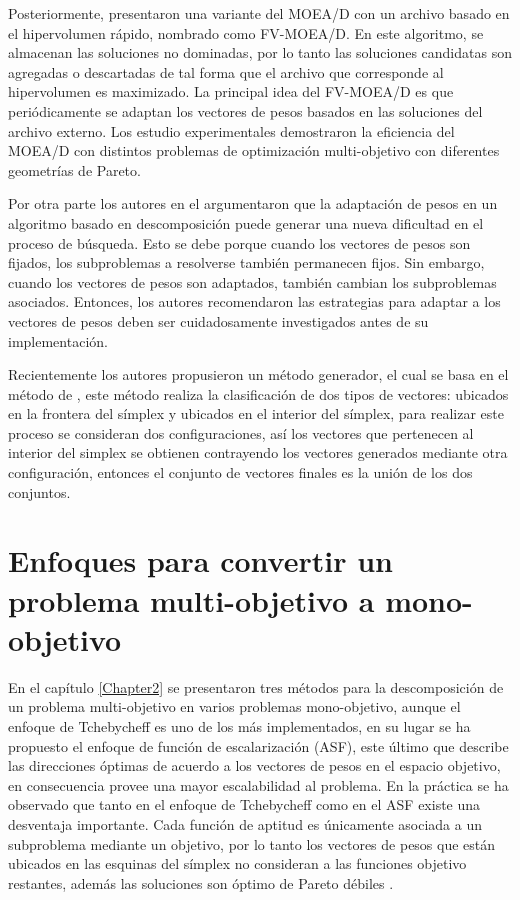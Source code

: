 Posteriormente, \cite{jiang2016towards} presentaron una variante del MOEA/D con un archivo basado en el hipervolumen rápido, nombrado como FV-MOEA/D. 
%
En este algoritmo, se almacenan las soluciones no dominadas, por lo tanto las soluciones candidatas son agregadas o descartadas de tal forma que el archivo que corresponde al hipervolumen es maximizado.
%
La principal idea del FV-MOEA/D es que periódicamente se adaptan los vectores de pesos basados en las soluciones del archivo externo.
%
Los estudio experimentales demostraron la eficiencia del MOEA/D con distintos problemas de optimización multi-objetivo con diferentes geometrías de Pareto.

Por otra parte los autores \citeauthor{giagkiozis2013towards} en el \citeyear{giagkiozis2013towards} argumentaron que la adaptación de pesos en un algoritmo basado en descomposición puede generar una nueva dificultad en el proceso de búsqueda.
%
Esto se debe porque cuando los vectores de pesos son fijados, los subproblemas a resolverse también permanecen fijos.
%
Sin embargo, cuando los vectores de pesos son adaptados, también cambian los subproblemas asociados.
%
Entonces, los autores recomendaron las estrategias para adaptar a los vectores de pesos deben ser cuidadosamente investigados antes de su implementación.
%

Recientemente los autores \cite{li2015evolutionary} propusieron un método generador, el cual se basa en el método de \citeauthor{das1998normal}, este  método realiza la clasificación de dos tipos de vectores: ubicados en la frontera del símplex y ubicados en el interior del símplex, para realizar este proceso se consideran dos configuraciones, así los vectores que pertenecen al interior del simplex se obtienen contrayendo los vectores generados mediante otra configuración, entonces el conjunto de vectores finales es la unión de los dos conjuntos.


\section{Enfoques para convertir un problema multi-objetivo a mono-objetivo}

En el capítulo \ref{Chapter2} se presentaron tres métodos para la descomposición de un problema multi-objetivo en varios problemas mono-objetivo, aunque el enfoque de Tchebycheff es uno de los más implementados, en su lugar se ha propuesto el enfoque de función de escalarización (ASF), este último que describe las direcciones óptimas de acuerdo a los vectores de pesos en el espacio objetivo, en consecuencia provee una mayor escalabilidad al problema.
%
En la práctica se ha observado que tanto en el enfoque de Tchebycheff como en el ASF existe una desventaja importante.
%
Cada función de aptitud es únicamente asociada a un subproblema mediante un objetivo, por lo tanto los vectores de pesos que están ubicados en las esquinas del símplex no consideran a las funciones objetivo restantes, además las soluciones son óptimo de Pareto débiles \citep{miettinen2002scalarizing}.


